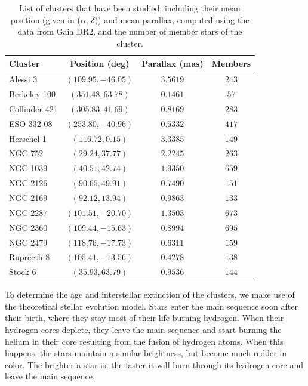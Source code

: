 \documentclass[twocolumn]{revtex4}
\begin{document}
\begin{table}[h!]
\begin{tabular}{|l|c|c|c|}
\hline
\textbf{Cluster} & \textbf{Position (deg)} & \textbf{Parallax (mas)} & \textbf{Members} \\
\hline
Alessi 3 & $(109.95, -46.05)$ & $3.5619$ & $243$ \\
\hline
Berkeley 100 & $(351.48, 63.78)$ & $0.1461$ & $57$ \\
\hline
Collinder 421 & $(305.83, 41.69)$ & $0.8169$ & $283$ \\
\hline
ESO 332 08 & $(253.80, -40.96)$ & $0.5332$ & $417$ \\
\hline
Herschel 1 & $(116.72, 0.15)$ & $3.3385$ & $149$ \\
\hline
NGC 752 & $(29.24, 37.77)$ & $2.2245$ & $263$ \\
\hline
NGC 1039 & $(40.51, 42.74)$ & $1.9350$ & $659$ \\
\hline
NGC 2126 & $(90.65, 49.91)$ & $0.7490$ & $151$ \\
\hline
NGC 2169 & $(92.12, 13.94)$ & $0.9863$ & $133$ \\
\hline
NGC 2287 & $(101.51, -20.70)$ & $1.3503$ & $673$ \\
\hline
NGC 2360 & $(109.44, -15.63)$ & $0.8994$ & $695$ \\
\hline
NGC 2479 & $(118.76, -17.73)$ & $0.6311$ & $159$ \\
\hline
Ruprecth 8 & $(105.41, -13.56)$ & $0.4278$ & $138$ \\
\hline
Stock 6 & $(35.93, 63.79)$ & $0.9536$ & $144$ \\
\hline
\end{tabular}
\caption{List of clusters that have been studied, including their mean position (given in ($\alpha$, $\delta$)) and mean parallax, computed using the data from Gaia DR2, and the number of member stars of the cluster.} %
\label{tab:clusters}
\end{table}

To determine the age and interstellar extinction of the clusters, we make use of the theoretical stellar evolution model. Stars enter the main sequence soon after their birth, where they stay most of their life burning hydrogen. When their hydrogen cores deplete, they leave the main sequence and start burning the helium in their core resulting from the fusion of hydrogen atoms. When this happens, the stars maintain a similar brightness, but become much redder in color. The brighter a star is, the faster it will burn through its hydrogen core and leave the main sequence.
\end{document}
